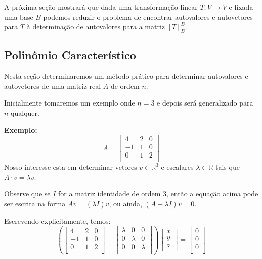 \documentclass[oneside,a4paper,12pt]{article}
\begin{document}
A próxima seção mostrará que dada uma transformação linear $T: V \rightarrow V$ e fixada uma base $B$ podemos reduzir o problema de encontrar autovalores e autovetores para $T$ à determinação de autovalores para a matriz $[T]_{B}^{B}$.

\subsection{Polinômio Característico}

Nesta seção determinaremos um método prático para determinar autovalores e autovetores de uma matriz real $A$ de ordem $n$.

Inicialmente tomaremos um exemplo onde $n=3$ e depois será generalizado para $n$ qualquer.

{\bf Exemplo: }
$$A = \left[
\begin{array}{ccc}
4	&	2	&	0\\
-1	&	1	&	0 \\
0	&	1	&	2	\\
\end{array}
\right]$$
Nosso interesse esta em determinar vetores $v \in \mathbb{R}^3$ e escalares $\lambda \in \mathbb{R}$ tais que $A \cdot v = \lambda v$.

Observe que se $I$ for a matriz identidade de ordem $3$, então a equação acima pode ser escrita na forma $Av = (\lambda I)v$, ou ainda, $(A - \lambda I)v = 0$.

Escrevendo explicitamente, temos:
$$\left( \left[
\begin{array}{ccc}
4	&	2	&	0\\
-1	&	1	&	0 \\
0	&	1	&	2	\\
\end{array}
\right] - \left[
\begin{array}{ccc}
\lambda	&	0		&	0\\
0		&	\lambda	&	0 \\
0		&	0		&	\lambda	\\
\end{array}
\right] \right) \left[
\begin{array}{c}
x	\\
y	\\
z	\\
\end{array}
\right] = 
\left[
\begin{array}{c}
0	\\
0	\\
0	\\
\end{array}
\right]$$
\end{document}

